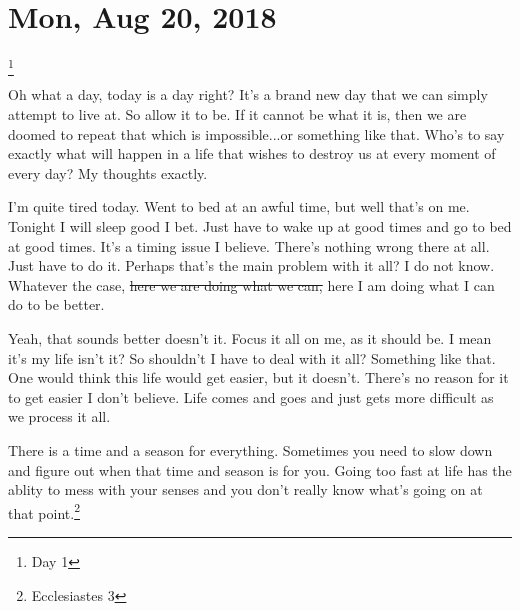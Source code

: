 \section{Mon, Aug 20, 2018}\footnote{Day 1}

Oh what a day, today is a day right? It's a brand new day that we can simply attempt
to live at. So allow it to be. If it cannot be what it is, then we are doomed to
repeat that which is impossible...or something like that. Who's to say exactly what
will happen in a life that wishes to destroy us at every moment of every day? My
thoughts exactly.

I'm quite tired today. Went to bed at an awful time, but well that's on me. Tonight I
will sleep good I bet. Just have to wake up at good times and go to bed at good
times. It's a timing issue I believe. There's nothing wrong there at all. Just have
to do it. Perhaps that's the main problem with it all? I do not know. Whatever the
case, \st{here we are doing what we can,} here I am doing what I can do to be better.

Yeah, that sounds better doesn't it. Focus it all on me, as it should be. I mean it's
my life isn't it? So shouldn't I have to deal with it all? Something like that. One
would think this life would get easier, but it doesn't. There's no reason for it to
get easier I don't believe. Life comes and goes and just gets more difficult as we
process it all.

There is a time and a season for everything. Sometimes you need to slow down and
figure out when that time and season is for you. Going too fast at life has the
ablity to mess with your senses and you don't really know what's going on at that
point.\footnote{Ecclesiastes 3}